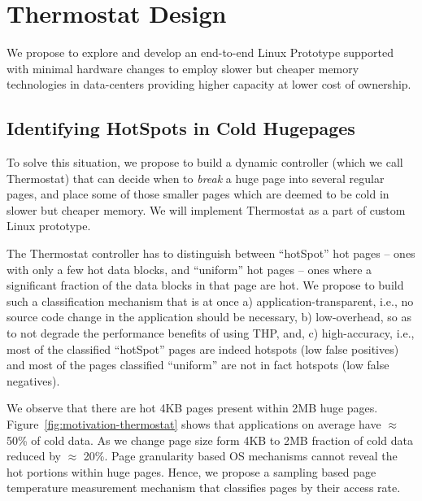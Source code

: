 \section{Thermostat Design}
\label{proposal}
We propose to explore and develop an end-to-end Linux Prototype supported with
minimal hardware changes to employ slower but cheaper memory technologies in
data-centers providing higher capacity at lower cost of ownership.

\subsection{Identifying HotSpots in Cold Hugepages}

To solve this situation, we propose to build a dynamic controller (which we call
Thermostat) that can decide when to {\it break} a huge page into several regular
pages, and place some of those smaller pages which are deemed to be cold in
slower but cheaper memory. We will implement Thermostat as a part of custom
Linux prototype.

The Thermostat controller has to distinguish between ``hotSpot'' hot pages --
ones with only a few hot data blocks, and ``uniform'' hot pages -- ones where a
significant fraction of the data blocks in that page are hot.  We propose to
build such a classification mechanism that is at once a)
application-transparent, i.e., no source code change in the application should
be necessary, b) low-overhead, so as to not degrade the performance benefits of
using THP, and, c) high-accuracy, i.e., most of the classified ``hotSpot'' pages
are indeed hotspots (low false positives) and most of the pages classified
``uniform'' are {\it} not in fact hotspots (low false negatives).

We observe that there are hot 4KB pages present within 2MB huge pages.
Figure~\ref{fig:motivation-thermostat} shows that applications on average have
$\approx$ 50\% of cold data. As we change page size form 4KB to 2MB fraction of
cold data reduced by $\approx$ 20\%. Page granularity based OS mechanisms cannot
reveal the hot portions within huge pages. Hence, we propose a sampling based
page temperature measurement mechanism that classifies pages by their access
rate.


